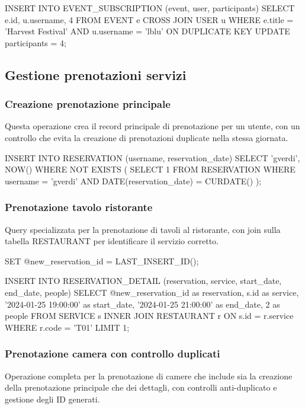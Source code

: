\documentclass[a4paper,12pt]{report}
\begin{document}
\begin{sqlcode}[caption={Query per iscrizione evento}]
INSERT INTO EVENT_SUBSCRIPTION (event, user, participants)
SELECT 
    e.id,
    u.username,
    4
FROM EVENT e
CROSS JOIN USER u
WHERE e.title = 'Harvest Festival' 
    AND u.username = 'lblu'
ON DUPLICATE KEY UPDATE participants = 4;
\end{sqlcode}



\subsection{Gestione prenotazioni servizi} 

\subsubsection{Creazione prenotazione principale} 
Questa operazione crea il record principale di prenotazione per un utente, con un controllo che evita la creazione di prenotazioni duplicate nella stessa giornata.

\begin{sqlcode}[caption={Query per creazione prenotazione principale}]
INSERT INTO RESERVATION (username, reservation_date)
SELECT 'gverdi', NOW()
WHERE NOT EXISTS (
    SELECT 1 FROM RESERVATION 
    WHERE username = 'gverdi' 
    AND DATE(reservation_date) = CURDATE()
);
\end{sqlcode}


\subsubsection{Prenotazione tavolo ristorante} 
Query specializzata per la prenotazione di tavoli al ristorante, con join sulla tabella RESTAURANT per identificare il servizio corretto.

\begin{sqlcode}[caption={Query per prenotazione tavolo ristorante}]
SET @new_reservation_id = LAST_INSERT_ID();

INSERT INTO RESERVATION_DETAIL (reservation, service, start_date, end_date, people)
SELECT 
    @new_reservation_id as reservation,
    s.id as service,
    '2024-01-25 19:00:00' as start_date,
    '2024-01-25 21:00:00' as end_date,
    2 as people
FROM SERVICE s
INNER JOIN RESTAURANT r ON s.id = r.service
WHERE r.code = 'T01'
LIMIT 1;
\end{sqlcode}

\subsubsection{Prenotazione camera con controllo duplicati} 
Operazione completa per la prenotazione di camere che include sia la creazione della prenotazione principale che dei dettagli, con controlli anti-duplicato e gestione degli ID generati.
\end{document}
